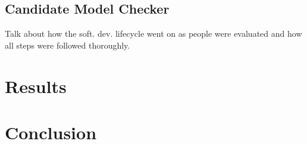 \documentclass[paper=a4, fontsize=11pt]{scrartcl} %
\numberwithin{equation}{section} %
\numberwithin{figure}{section} %
\numberwithin{table}{section} %
\begin{document}

\subsection{Candidate Model Checker}

\par
Talk about how the soft. dev. lifecycle went on as people were evaluated and how all steps were followed thoroughly.



\section{Results}



\section{Conclusion}



\end{document}
